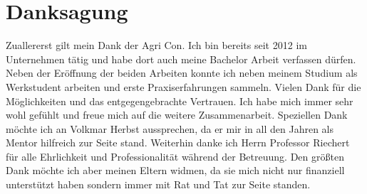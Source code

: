 
\chapter*{Danksagung}
\label{sec:Danksagung}
Zuallererst gilt mein Dank der Agri Con.
Ich bin bereits seit 2012 im Unternehmen tätig und habe dort auch meine Bachelor Arbeit verfassen dürfen.
Neben der Eröffnung der beiden Arbeiten konnte ich neben meinem Studium als Werkstudent arbeiten und erste Praxiserfahrungen sammeln.
Vielen Dank für die Möglichkeiten und das entgegengebrachte Vertrauen.
Ich habe mich immer sehr wohl gefühlt und freue mich auf die weitere Zusammenarbeit.
Speziellen Dank möchte ich an Volkmar Herbst aussprechen, da er mir in all den Jahren als Mentor hilfreich zur Seite stand.
Weiterhin danke ich Herrn Professor Riechert für alle Ehrlichkeit und Professionalität während der Betreuung.
Den größten Dank möchte ich aber meinen Eltern widmen, da sie mich nicht nur finanziell unterstützt haben sondern immer mit Rat und Tat zur Seite standen.